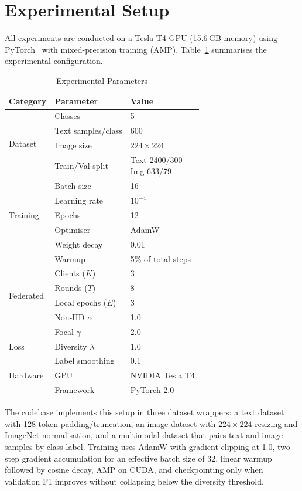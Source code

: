 \documentclass[12pt, a4paper, oneside]{Thesis}
\begin{document}
\section{Experimental Setup}

All experiments are conducted on a Tesla T4 GPU (15.6\,GB memory) using PyTorch~\cite{Paszke2019} with
mixed-precision training (AMP). Table~\ref{tab:expsetup} summarises the experimental
configuration.

\begin{table}[t]
\caption{Experimental Parameters}
\label{tab:expsetup}
\centering\footnotesize
\begin{tabular}{llp{2.6cm}}
\toprule
\textbf{Category} & \textbf{Parameter} & \textbf{Value}\\
\midrule
\multirow{4}{*}{Dataset}
  & Classes          & 5 \\
  & Text samples/class & 600 \\
  & Image size       & $224{\times}224$ \\
  & Train/Val split  & \shortstack[l]{Text 2400/300\\Img 633/79} \\
\midrule
\multirow{5}{*}{Training}
  & Batch size  & 16 \\
  & Learning rate & $10^{-4}$ \\
  & Epochs      & 12 \\
  & Optimiser   & AdamW \\
  & Weight decay & 0.01 \\
  & Warmup      & 5\% of total steps \\
\midrule
\multirow{4}{*}{Federated}
  & Clients ($K$)   & 3 \\
  & Rounds ($T$)    & 8 \\
  & Local epochs ($E$) & 3 \\
  & Non-IID $\alpha$ & 1.0 \\
\midrule
\multirow{3}{*}{Loss}
  & Focal $\gamma$  & 2.0 \\
  & Diversity $\lambda$ & 1.0 \\
  & Label smoothing & 0.1 \\
\midrule
Hardware
  & GPU       & NVIDIA Tesla T4 \\
  & Framework & PyTorch 2.0+ \\
\bottomrule
\end{tabular}
\end{table}

The codebase implements this setup in three dataset wrappers: a text dataset with
128-token padding/truncation, an image dataset with $224{\times}224$ resizing and
ImageNet normalisation, and a multimodal dataset that pairs text and image samples
by class label. Training uses AdamW with gradient clipping at 1.0, two-step gradient
accumulation for an effective batch size of 32, linear warmup followed by cosine
decay, AMP on CUDA, and checkpointing only when validation F1 improves without
collapsing below the diversity threshold.
\end{document}

